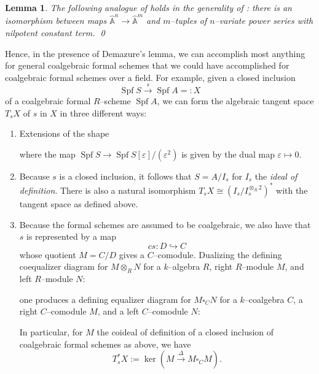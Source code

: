 \documentclass{amsart}
\newcommand{\A}{\widehat{\mathbb{A}}}
\newcommand{\<}{\langle}
\renewcommand{\>}{\rangle}
\newcommand{\eps}{\varepsilon}
\newcommand{\into}{\hookrightarrow}
\newcommand{\cotensor}{\square}
\DeclareMathOperator{\Spf}{Spf}
\theoremstyle{plain}
\newtheorem*{lemma}{Lemma}
\theoremstyle{definition}
\theoremstyle{remark}
\begin{document}
\begin{lemma}\label{MapsOfAffineSpaces}
The following analogue of  holds in the generality of : there is an isomorphism between maps $\A^n \to \A^m$ and $m$--tuples of $n$--variate power series with nilpotent constant term. \qed
\end{lemma}

Hence, in the presence of Demazure's lemma, we can accomplish most anything for general coalgebraic formal schemes that we could have accomplished for coalgebraic formal schemes over a field.  For example, given a closed inclusion \[\Spf S \xrightarrow{s} \Spf A =: X\] of a coalgebraic formal $R$--scheme $\Spf A$, we can form the algebraic tangent space $T_s X$ of $s$ in $X$ in three different ways:
\begin{enumerate}
\item Extensions of the shape
\begin{center}
\end{center}
where the map $\Spf S \to \Spf S[\eps] / (\eps^2)$ is given by the dual map $\eps \mapsto 0$.
\item Because $s$ is a closed inclusion, it follows that $S = A / I_s$ for $I_s$ the \textit{ideal of definition}.  There is also a natural isomorphism $T_s X \cong (I_s / I_s^{\otimes_R 2})^*$ with the tangent space as defined above.
\item Because the formal schemes are assumed to be coalgebraic, we also have that $s$ is represented by a map \[c s: D \into C\] whose quotient $M = C / D$ gives a $C$--comodule.  Dualizing the defining coequalizer diagram for $M \otimes_R N$ for a $k$--algebra $R$, right $R$--module $M$, and left $R$--module $N$:
\begin{center}
\end{center}
one produces a defining equalizer diagram for $M \cotensor_C N$ for a $k$--coalgebra $C$, a right $C$--comodule $M$, and a left $C$--comodule $N$:
\begin{center}
\end{center}
In particular, for $M$ the coideal of definition of a closed inclusion of coalgebraic formal schemes as above, we have \[T^*_s X := \ker\left( M \xrightarrow{\Delta} M \cotensor_C M \right).\]
\end{enumerate}
\end{document}
